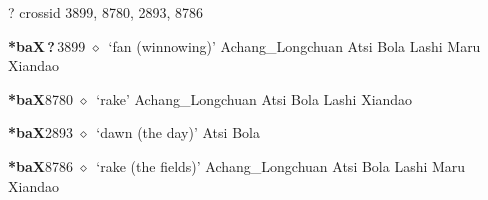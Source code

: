 ?
  {\tiny crossid 3899, 8780, 2893, 8786}
  \begin{list}{}{\leftmargin=1.5em \itemindent=-1.5em}
  \item {\footnotesize \textbf{*baX\,?\,}}{\tiny 3899}
         $\diamond$~`fan (winnowing)'
         Achang\_Longchuan 
\hspace{1ex}
         Atsi 
\hspace{1ex}
         Bola 
\hspace{1ex}
         Lashi 
\hspace{1ex}
         Maru 
\hspace{1ex}
         Xiandao 
  \item {\footnotesize \textbf{*baX}}{\tiny 8780}
\hspace{1ex}
         $\diamond$~`rake'
         Achang\_Longchuan 
\hspace{1ex}
         Atsi 
\hspace{1ex}
         Bola 
\hspace{1ex}
         Lashi 
\hspace{1ex}
         Xiandao 
  \item {\footnotesize \textbf{*baX}}{\tiny 2893}
\hspace{1ex}
         $\diamond$~`dawn (the day)'
         Atsi 
\hspace{1ex}
         Bola 
  \item {\footnotesize \textbf{*baX}}{\tiny 8786}
\hspace{1ex}
         $\diamond$~`rake (the fields)'
         Achang\_Longchuan 
\hspace{1ex}
         Atsi 
\hspace{1ex}
         Bola 
\hspace{1ex}
         Lashi 
\hspace{1ex}
         Maru 
\hspace{1ex}
         Xiandao 
  \end{list}
